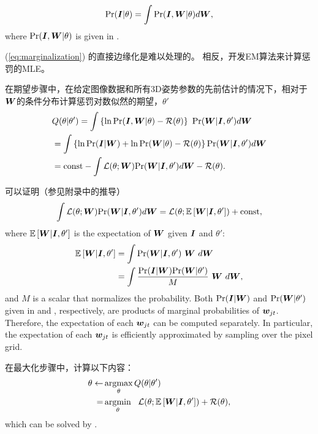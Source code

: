 \begin{align}
\mbox{Pr}({\bm{I}}|\theta) = \int\mbox{Pr}({\bm{I}},{\bm{W}}|\theta)d{\bm{W}}, \label{eq:marginalization}
\end{align}
where $\mbox{Pr}({\bm{I}},{\bm{W}}|\theta)$ is given in .

(\ref{eq:marginalization}) 的直接边缘化是难以处理的。
相反，开发EM算法来计算惩罚的MLE。

在期望步骤中，在给定图像数据和所有3D姿势参数的先前估计的情况下，相对于${\bm{W}}$的条件分布计算惩罚对数似然的期望，$\theta'$
\begin{align}
&Q(\theta|\theta') = \int \left\{\ln\mbox{Pr}({\bm{I}},{\bm{W}}|\theta) - \mathcal{R}(\theta)\right\} ~ \mbox{Pr}({\bm{W}}|{\bm{I}},\theta') d{\bm{W}} \nonumber \\
&= \int \left\{\ln\mbox{Pr}({\bm{I}}|{\bm{W}}) + \ln\mbox{Pr}({\bm{W}}|\theta) - \mathcal{R}(\theta)\right\} \mbox{Pr}({\bm{W}}|{\bm{I}},\theta') d{\bm{W}} \nonumber \\
&= \mbox{const} - \int \mathcal{L}(\theta;{\bm{W}}) \mbox{Pr}({\bm{W}}|{\bm{I}},\theta') d{\bm{W}} - \mathcal{R}(\theta).
\end{align}

可以证明（参见附录中的推导）
\begin{align}\label{eq:der1}
\int \mathcal{L}(\theta;{\bm{W}}) \mbox{Pr}({\bm{W}}|{\bm{I}},\theta') d{\bm{W}} = \mathcal{L}(\theta;\mathbb{E}\left[{\bm{W}}|{\bm{I}},\theta'\right]) + \mbox{const},
\end{align}
where $\mathbb{E}\left[{\bm{W}}|{\bm{I}},\theta'\right]$ is the expectation of ${\bm{W}}$ given ${\bm{I}}$ and $\theta'$:
\begin{align}\label{eq:der2}
\mathbb{E}\left[{\bm{W}}|{\bm{I}},\theta'\right]
&= \int \mbox{Pr}({\bm{W}}|{\bm{I}},\theta')~ {\bm{W}} ~ d{\bm{W}} \nonumber \\
&= \int \frac{\mbox{Pr}({\bm{I}}|{\bm{W}})\mbox{Pr}({\bm{W}}|\theta')}{M} ~ {\bm{W}} ~ d{\bm{W}},
\end{align}
and $M$ is a scalar that normalizes the probability. 
Both $\mbox{Pr}({\bm{I}}|{\bm{W}})$ and $\mbox{Pr}({\bm{W}}|\theta')$ given in  and , respectively, are products of marginal probabilities of ${\bm{w}}_{jt}$. Therefore,
the expectation of each ${\bm{w}}_{jt}$ can be computed separately. In particular, the expectation of each ${\bm{w}}_{jt}$ is efficiently approximated by sampling over the pixel grid.

在最大化步骤中，计算以下内容：
\begin{align}
\theta \leftarrow &\operatorname*{arg\!\max}_{\theta} Q(\theta|\theta') \nonumber \\
= &\operatorname*{arg\!\min}_{\theta} ~~ \mathcal{L}(\theta;\mathbb{E}\left[{\bm{W}}|{\bm{I}},\theta'\right]) + \mathcal{R}(\theta),
\end{align}
which can be solved by .

